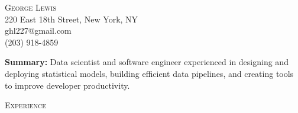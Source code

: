 \documentclass[9pt]{article}
\newenvironment{changemargin}[2]{%
  \begin{list}{}{%
    \setlength{\topsep}{0pt}%
    \setlength{\leftmargin}{#1}%
    \setlength{\rightmargin}{#2}%
    \setlength{\listparindent}{\parindent}%
    \setlength{\itemindent}{\parindent}%
    \setlength{\parsep}{\parskip}%
  }%
  \item[]}{\end{list}
}
\newcommand{\lineover}{
  \begin{changemargin}{-0.05in}{-0.05in}
    \vspace*{-8pt}
    \hrulefill \\
    \vspace*{-2pt}
  \end{changemargin}
}
\newcommand{\header}[1]{
  \begin{changemargin}{-0.5in}{-0.5in}
    \scshape{#1}
    \lineover
  \end{changemargin}
}
\newcommand{\contact}[4]{
  \begin{changemargin}{-0.5in}{-0.5in}
    \begin{center}
      {\Large \scshape {#1}} \\ \smallskip
      {#2} \\ \smallskip
      {#3} \\ \smallskip
      {#4} \\ \smallskip
    \end{center}
  \end{changemargin}
}
\newenvironment{body} {
  \vspace*{-16pt}
\begin{changemargin}{-0.25in}{-0.5in}
  }
{\end{changemargin}
}
\begin{document}
\contact{George Lewis}
        {220 East 18th Street, New York, NY}
        {ghl227@gmail.com}
        {(203) 918-4859}
\smallskip

\begin{body}
  \vspace{14pt}
  \textbf{Summary:}{} Data scientist and software engineer experienced in designing and deploying statistical models, building efficient data pipelines, and creating tools to improve developer productivity.

\end{body}

\smallskip

\header{Experience}
\end{document}
